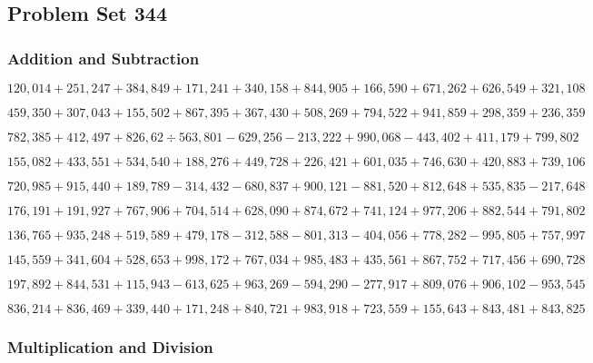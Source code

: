 \hypertarget{problem-set-344}{%
\subsection{Problem Set 344}\label{problem-set-344}}

\hypertarget{addition-and-subtraction}{%
\subsubsection{Addition and
Subtraction}\label{addition-and-subtraction}}

\(120,014+251,247+384,849+171,241+340,158+844,905+166,590+671,262+626,549+321,108\)

\(459,350+307,043+155,502+867,395+367,430+508,269+794,522+941,859+298,359+236,359\)

\(782,385+412,497+826,62÷563,801-629,256-213,222+990,068-443,402+411,179+799,802\)

\(155,082+433,551+534,540+188,276+449,728+226,421+601,035+746,630+420,883+739,106\)

\(720,985+915,440+189,789-314,432-680,837+900,121-881,520+812,648+535,835-217,648\)

\(176,191+191,927+767,906+704,514+628,090+874,672+741,124+977,206+882,544+791,802\)

\(136,765+935,248+519,589+479,178-312,588-801,313-404,056+778,282-995,805+757,997\)

\(145,559+341,604+528,653+998,172+767,034+985,483+435,561+867,752+717,456+690,728\)

\(197,892+844,531+115,943-613,625+963,269-594,290-277,917+809,076+906,102-953,545\)

\(836,214+836,469+339,440+171,248+840,721+983,918+723,559+155,643+843,481+843,825\)

\hypertarget{multiplication-and-division}{%
\subsubsection{Multiplication and
Division}\label{multiplication-and-division}}


